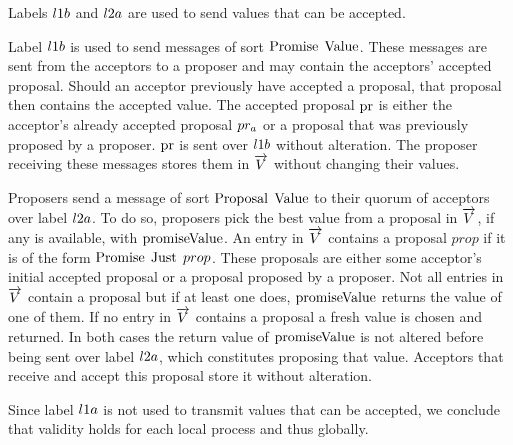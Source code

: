 Labels $l1b$ and $l2a$ are used to send values that can be accepted.

Label $l1b$ is used to send messages of sort $\operatorname{Promise}\; \operatorname{Value}$.
These messages are sent from the acceptors to a proposer and may contain the acceptors' accepted proposal.
Should an acceptor previously have accepted a proposal, that proposal then contains the accepted value.
The accepted proposal $\operatorname{pr}$ is either the acceptor's already accepted proposal $pr_{a}$ or a proposal that was previously proposed by a proposer.
$\operatorname{pr}$ is sent over $l1b$ without alteration.
The proposer receiving these messages stores them in $\overrightarrow{V}$ without changing their values.

Proposers send a message of sort $\operatorname{Proposal}\; \operatorname{Value}$ to their quorum of acceptors over label $l2a$.
To do so, proposers pick the best value from a proposal in $\overrightarrow{V}$, if any is available, with $\operatorname{promiseValue}$.
An entry in $\overrightarrow{V}$ contains a proposal $prop$ if it is of the form $\operatorname{Promise}\; \operatorname{Just}\; prop$.
These proposals are either some acceptor's initial accepted proposal or a proposal proposed by a proposer.
Not all entries in $\overrightarrow{V}$ contain a proposal but if at least one does, $\operatorname{promiseValue}$ returns the value of one of them.
If no entry in $\overrightarrow{V}$ contains a proposal a fresh value is chosen and returned.
In both cases the return value of $\operatorname{promiseValue}$ is not altered before being sent over label $l2a$, which constitutes proposing that value.
Acceptors that receive and accept this proposal store it without alteration.

Since label $l1a$ is not used to transmit values that can be accepted, we conclude that validity holds for each local process and thus globally.


